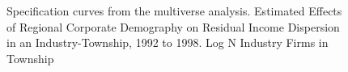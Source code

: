 \documentclass{article}
\begin{document}
\begin{figure}[htbp]
  \centering
  \caption{Specification curves from the multiverse analysis. Estimated Effects of Regional Corporate Demography on Residual Income Dispersion in an Industry-Township, 1992 to 1998.  Log N Industry Firms in Township}
  \label{fig:gross_income}
  
\end{figure}


\clearpage %
\end{document}
